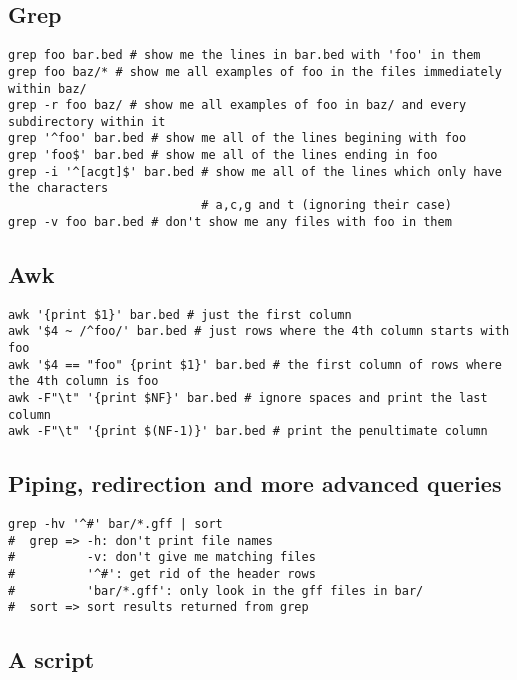 \documentclass[11pt]{article}
\begin{document}
\hypertarget{grep}{%
\subsection{Grep}\label{grep}}

\begin{verbatim}
grep foo bar.bed # show me the lines in bar.bed with 'foo' in them
grep foo baz/* # show me all examples of foo in the files immediately within baz/
grep -r foo baz/ # show me all examples of foo in baz/ and every subdirectory within it
grep '^foo' bar.bed # show me all of the lines begining with foo
grep 'foo$' bar.bed # show me all of the lines ending in foo
grep -i '^[acgt]$' bar.bed # show me all of the lines which only have the characters
                           # a,c,g and t (ignoring their case)
grep -v foo bar.bed # don't show me any files with foo in them
\end{verbatim}

\hypertarget{awk}{%
\subsection{Awk}\label{awk}}

\begin{verbatim}
awk '{print $1}' bar.bed # just the first column
awk '$4 ~ /^foo/' bar.bed # just rows where the 4th column starts with foo
awk '$4 == "foo" {print $1}' bar.bed # the first column of rows where the 4th column is foo
awk -F"\t" '{print $NF}' bar.bed # ignore spaces and print the last column
awk -F"\t" '{print $(NF-1)}' bar.bed # print the penultimate column
\end{verbatim}

\hypertarget{piping-redirection-and-more-advanced-queries}{%
\subsection{Piping, redirection and more advanced
queries}\label{piping-redirection-and-more-advanced-queries}}

\begin{verbatim}
grep -hv '^#' bar/*.gff | sort
#  grep => -h: don't print file names
#          -v: don't give me matching files
#          '^#': get rid of the header rows
#          'bar/*.gff': only look in the gff files in bar/
#  sort => sort results returned from grep
\end{verbatim}

\hypertarget{a-script}{%
\subsection{A script}\label{a-script}}
\end{document}

